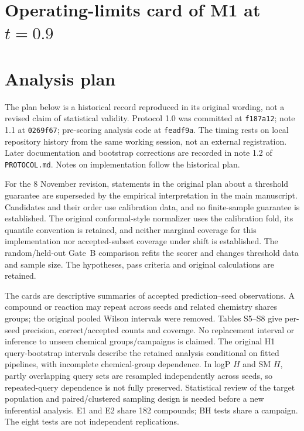 \documentclass[11pt,letterpaper]{article}
\begin{document}
\clearpage
\section{Operating-limits card of M1 at \texorpdfstring{$t = 0.9$}{t = 0.9}}

\begin{table}[htbp]
\centering
\caption{Operating-limits card for Gate~B with M1 at $t = 0.9$. Definitions as in Table~4 of the main text.}
\small
\resizebox{\linewidth}{!}{}
\end{table}

\section{Analysis plan}

The plan below is a historical record reproduced in its original wording, not a revised claim of statistical validity. Protocol 1.0 was committed at \texttt{f187a12}; note 1.1 at \texttt{0269f67}; pre-scoring analysis code at \texttt{feadf9a}. The timing rests on local repository history from the same working session, not an external registration. Later documentation and bootstrap corrections are recorded in note 1.2 of \texttt{PROTOCOL.md}. Notes on implementation follow the historical plan.

For the 8 November revision, statements in the original plan about a threshold guarantee are superseded by the empirical interpretation in the main manuscript. Candidates and their order use calibration data, and no finite-sample guarantee is established. The original conformal-style normalizer uses the calibration fold, its quantile convention is retained, and neither marginal coverage for this implementation nor accepted-subset coverage under shift is established. The random/held-out Gate~B comparison refits the scorer and changes threshold data and sample size. The hypotheses, pass criteria and original calculations are retained.

The cards are descriptive summaries of accepted prediction--seed observations. A compound or reaction may repeat across seeds and related chemistry shares groups; the original pooled Wilson intervals were removed. Tables S5--S8 give per-seed precision, correct/accepted counts and coverage. No replacement interval or inference to unseen chemical groups/campaigns is claimed. The original H1 query-bootstrap intervals describe the retained analysis conditional on fitted pipelines, with incomplete chemical-group dependence. In logP $H$ and SM $H$, partly overlapping query sets are resampled independently across seeds, so repeated-query dependence is not fully preserved. Statistical review of the target population and paired/clustered sampling design is needed before a new inferential analysis. E1 and E2 share 182 compounds; BH tests share a campaign. The eight tests are not independent replications.
\end{document}
